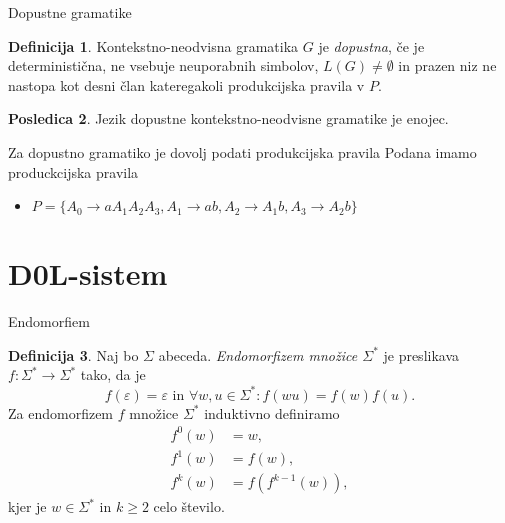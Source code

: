 \documentclass{beamer}
\theoremstyle{definition} %
\newtheorem{definicija}{Definicija}[section]
\newtheorem{posledica}[definicija]{Posledica}
\begin{document}
\begin{frame}{Dopustne gramatike}
    \begin{definicija}
        Kontekstno-neodvisna gramatika $G$ je \textit{dopustna}, če je deterministična, ne vsebuje neuporabnih simbolov,
        $ L(G) \neq \emptyset $ in prazen niz ne nastopa kot desni član kateregakoli produkcijska pravila v $ P $.
    \end{definicija}
    \pause
    \begin{posledica}
        Jezik dopustne kontekstno-neodvisne gramatike je enojec.
    \end{posledica}
\end{frame}

\begin{frame}
    \begin{exampleblock}{Za dopustno gramatiko je dovolj podati produkcijska pravila}
        Podana imamo produckcijska pravila 
        \begin{itemize}
            \item $ P = \{ A_0 \rightarrow aA_1A_2A_3, A_1 \rightarrow ab, A_2 \rightarrow A_1b, A_3 \rightarrow A_2b \} $ 
        \end{itemize}
        \pause
        \pause
        \pause
    \end{exampleblock}
\end{frame}

\section{D0L-sistem}

\begin{frame}{Endomorfiem}
    \begin{definicija}
        Naj bo $ \Sigma $ abeceda. \textit{Endomorfizem množice $ \Sigma^* $} je preslikava $ f \colon \Sigma^* \to \Sigma^* $
        tako, da je
        \[
            f(\varepsilon) = \varepsilon \text{ in } \forall w,u \in \Sigma^* \colon f(wu) = f(w)f(u).
        \]
        \pause
        Za endomorfizem $ f $ množice $ \Sigma^* $ induktivno definiramo
        \begin{align*}
            f^0(w) &= w, \\
            f^1(w) &= f(w), \\
            f^k(w) &= f(f^{k-1}(w)),
        \end{align*}
        kjer je $ w \in \Sigma^* $ in $ k \geq 2 $ celo število.
    \end{definicija}
\end{frame}
\end{document}
